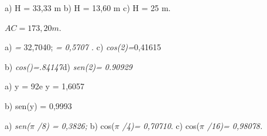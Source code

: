 \begin{respostas}{4}
\begin{table}[H]
\begin{tabular}{p{0.5in}p{0.4in}p{0.66in}p{0.69in}p{0.59in}p{0.69in}}
\end{tabular}
 \end{table}

\ansitem{} a) H = 33,33 m        b) H =  13,60 m       c) H =    25 m.    

\ansitem{}  \( AC=173,20m \).
\end{respostas}

\begin{respostas}{5}

\ansitem{} a)  \textit{ =} 32,7040\degree ;  \textit{ = 0,5707 .}   \tab c) \textit{cos(2)=}0,41615

    b) \textit{cos()=.84147\tab \tab \tab }d) \textit{sen(2)=} \textit{0.90929}

\ansitem{} a) y = 92\degree e y = 1,6057

b) sen(y) = 0,9993

\ansitem{} a) \textit{sen($ \pi $ /8) = 0,3826;  \tab }b) cos(\textit{$ \pi $ /4)= 0,70710}. \tab c) cos(\textit{$ \pi $ /16)= 0,98078.}
\end{respostas}

